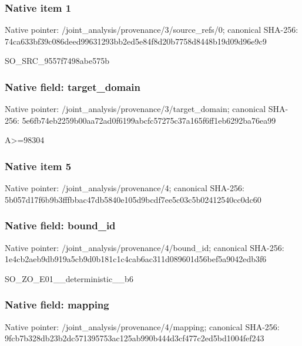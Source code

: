 \documentclass[10pt,a4paper]{article}
\begin{document}
\subsubsection{Native item 1}
Native pointer: /joint\_\allowbreak{}analysis/provenance/3/source\_\allowbreak{}refs/0; canonical SHA-256: 74ca633bf39c086deed99631293bb2ed5e84f8d20b7758d8448b19d09d96e9c9

\begingroup\raggedright\sloppy SO\_\allowbreak{}SRC\_\allowbreak{}9557f7498abe575b\par\endgroup

\subsubsection{Native field: target\_\allowbreak{}domain}
Native pointer: /joint\_\allowbreak{}analysis/provenance/3/target\_\allowbreak{}domain; canonical SHA-256: 5e6fb74eb2259b00aa72ad0f6199abcfc57275c37a165f6ff1eb6292ba76ea99

\begingroup\raggedright\sloppy A>=\allowbreak{}98304\par\endgroup

\subsubsection{Native item 5}
Native pointer: /joint\_\allowbreak{}analysis/provenance/4; canonical SHA-256: 5b057d17f6b9b3fffbbac47db5840e105d9bcdf7ee5c03c5b02412540cc0dc60

\subsubsection{Native field: bound\_\allowbreak{}id}
Native pointer: /joint\_\allowbreak{}analysis/provenance/4/bound\_\allowbreak{}id; canonical SHA-256: 1e4cb2aeb9db919a5cb9d0b181c1c4cab6ac311d089601d56bef5a9042edb3f6

\begingroup\raggedright\sloppy SO\_\allowbreak{}ZO\_\allowbreak{}E01\_\allowbreak{}\_\allowbreak{}deterministic\_\allowbreak{}\_\allowbreak{}b6\par\endgroup

\subsubsection{Native field: mapping}
Native pointer: /joint\_\allowbreak{}analysis/provenance/4/mapping; canonical SHA-256: 9fcb7b328db23b2dc571395753ac125ab990b444d3cf477c2ed5bd1004fef243
\end{document}
